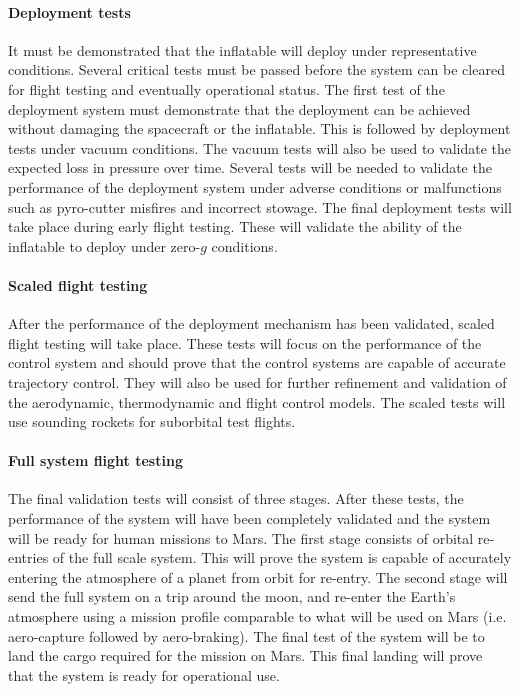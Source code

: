 \paragraph{Deployment tests}
It must be demonstrated that the inflatable will deploy under representative conditions. Several critical tests must be passed before the system can be cleared for flight testing and eventually operational status. The first test of the deployment system must demonstrate that the deployment can be achieved without damaging the spacecraft or the inflatable. This is followed by deployment tests under vacuum conditions. The vacuum tests will also be used to validate the expected loss in pressure over time. Several tests will be needed to validate the performance of the deployment system under adverse conditions or malfunctions such as pyro-cutter misfires and incorrect stowage. The final deployment tests will take place during early flight testing. These will validate the ability of the inflatable to deploy under zero-$g$ conditions. 

\paragraph{Scaled flight testing}
After the performance of the deployment mechanism has been validated, scaled flight testing will take place. These tests will focus on the  performance of the control system and should prove that the control systems are capable of accurate trajectory control. They will also be used for further refinement and validation of the aerodynamic, thermodynamic and flight control models.  The scaled tests will use sounding rockets for suborbital test flights.

\paragraph{Full system flight testing}
The final validation tests will consist of three stages. After these tests, the performance of the system will have been completely validated and the system will be ready for human missions to Mars. The first stage consists of orbital re-entries of the full scale system. This will prove the system is capable of accurately entering the atmosphere of a  planet from orbit for re-entry. The second stage will send the full system on a trip around the moon, and re-enter the Earth's atmosphere using a mission profile comparable to what will be used on Mars (i.e. aero-capture followed by aero-braking). The final test of the system will be to land the cargo required for the mission on Mars. This final landing will prove that the system is ready for operational use. 




